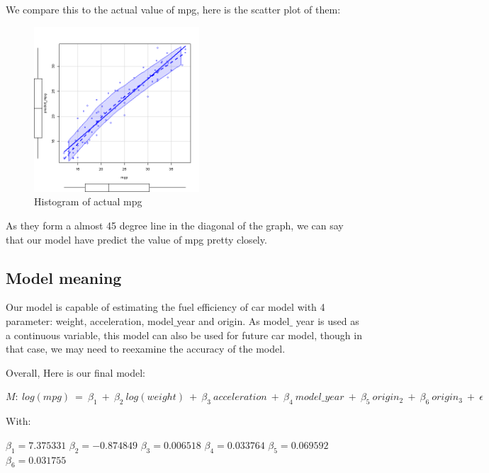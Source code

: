 We compare this to the actual value of mpg, here is the scatter plot of them:

\begin{figure}[H]
\centering
\includegraphics[width=0.55\textwidth]{img/mpgpredict.png}
\caption{Histogram of actual mpg}
\label{fig:scaled_revenue_distribution}
\end{figure}

As they form a almost 45 degree line in the diagonal of the graph, we can say that our model have predict the value of mpg pretty closely.

\subsection{Model meaning}

Our model is capable of estimating the fuel efficiency of car model with 4 parameter: weight, acceleration, model$\_$year and origin. As model$\_$ year is used as a continuous variable, this model can also be used for future car model, though in that case, we may need to reexamine the accuracy of the model.

Overall, Here is our final model:

\begin{center}
$
M: \ log(mpg) \ = \ \beta_1 \ + \ \beta_2 \ log(weight) \ + \ \beta_3 \ acceleration \ + \ \beta_4 \ model\_year \ + \ \beta_5 \ origin_2 \ + \ \beta_6 \ origin_3 \ + \ \epsilon
$
\end{center}

With:

\begin{center}
    $\beta_1 = 7.375331$
    $\beta_2 = -0.874849$
    $\beta_3 = 0.006518$
    $\beta_4 = 0.033764$
    $\beta_5 = 0.069592$
    $\beta_6 = 0.031755$
\end{center}

